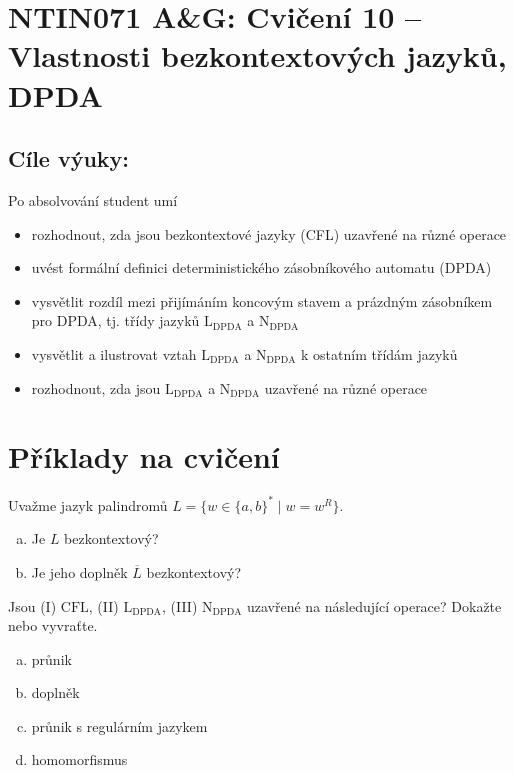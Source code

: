 \documentclass[a4paper,12pt]{amsart}
\begin{document}
\thispagestyle{empty}

\section*{NTIN071 A\&G: Cvičení 10 -- Vlastnosti bezkontextových jazyků, DPDA}

\medskip

\subsection*{Cíle výuky:} Po absolvování student umí

\begin{itemize}\setlength{\itemsep}{0pt}
    \item rozhodnout, zda jsou bezkontextové jazyky (CFL) uzavřené na různé operace
    \item uvést formální definici deterministického zásobníkového automatu (DPDA)
    \item vysvětlit rozdíl mezi přijímáním koncovým stavem a prázdným zásobníkem pro DPDA, tj. třídy jazyků $\mathrm{L_{DPDA}}$ a $\mathrm{N_{DPDA}}$
    \item vysvětlit a ilustrovat vztah $\mathrm{L_{DPDA}}$ a $\mathrm{N_{DPDA}}$ k ostatním třídám jazyků
    \item rozhodnout, zda jsou $\mathrm{L_{DPDA}}$ a $\mathrm{N_{DPDA}}$ uzavřené na různé operace
\end{itemize}

\section*{Příklady na cvičení}


\medskip\begin{problem}[Nepalidromy]
    Uvažme jazyk palindromů $L=\{w\in\{a,b\}^*\mid w=w^R\}$.
    \begin{enumerate}[(a)]
        \item Je $L$ bezkontextový?
        \item Je jeho doplněk $\overline{L}$ bezkontextový?
    \end{enumerate}
\end{problem}


\medskip\begin{problem}
    
    Jsou (I) $\mathrm{CFL}$, (II) $\mathrm{L_{DPDA}}$, (III) $\mathrm{N_{DPDA}}$ uzavřené na následující operace? Dokažte nebo vyvraťte.
    
    \begin{multicols}{2}
        \begin{enumerate}[(a)]
            \item průnik
            \item doplněk
            \item průnik s regulárním jazykem
            \item homomorfismus
        \end{enumerate}
    \end{multicols}    

\end{problem}
\end{document}
